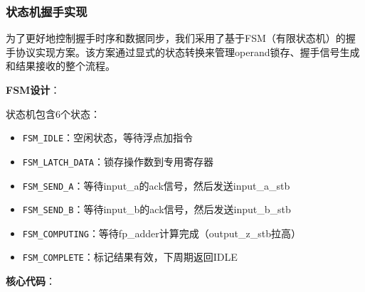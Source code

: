 \documentclass[12pt,a4paper]{article}
\begin{document}
\subsubsection{状态机握手实现}

为了更好地控制握手时序和数据同步，我们采用了基于FSM（有限状态机）的握手协议实现方案。该方案通过显式的状态转换来管理operand锁存、握手信号生成和结果接收的整个流程。

\textbf{FSM设计}：

状态机包含6个状态：
\begin{itemize}[itemsep=0pt, parsep=3pt]
    \item \texttt{FSM\_IDLE}：空闲状态，等待浮点加指令
    \item \texttt{FSM\_LATCH\_DATA}：锁存操作数到专用寄存器
    \item \texttt{FSM\_SEND\_A}：等待input\_a的ack信号，然后发送input\_a\_stb
    \item \texttt{FSM\_SEND\_B}：等待input\_b的ack信号，然后发送input\_b\_stb
    \item \texttt{FSM\_COMPUTING}：等待fp\_adder计算完成（output\_z\_stb拉高）
    \item \texttt{FSM\_COMPLETE}：标记结果有效，下周期返回IDLE
\end{itemize}

\textbf{核心代码}：
\end{document}
